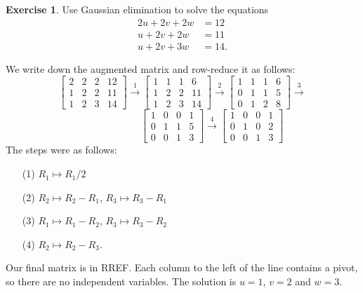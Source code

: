 \documentclass[a4paper]{book}
\newcommand{\xra}       {\xrightarrow}
\renewcommand{\:}{\colon}
\theoremstyle{definition}
\newtheorem{exercise}[theorem]{Exercise}
\renewenvironment{solution}{\SolutionInline}{\endSolutionInline}
\begin{document}
\begin{exercise}
 Use Gaussian elimination to solve the equations
 \begin{align*}
  2u + 2v + 2w &= 12 \\
   u + 2v + 2w &= 11 \\
   u + 2v + 3w &= 14.
 \end{align*}
\end{exercise}
\begin{solution}
 We write down the augmented matrix and row-reduce it as follows:
 {\small \[
  \left[\begin{array}{ccc|c}
    2 &  2 &  2 & 12 \\
    1 &  2 &  2 & 11 \\
    1 &  2 &  3 & 14
  \end{array}\right]
  \xra{1}
  \left[\begin{array}{ccc|c}
    1 &  1 &  1 &  6 \\
    1 &  2 &  2 & 11 \\
    1 &  2 &  3 & 14
  \end{array}\right]
  \xra{2}
  \left[\begin{array}{ccc|c}
    1 &  1 &  1 &  6 \\
    0 &  1 &  1 &  5 \\
    0 &  1 &  2 &  8
  \end{array}\right]
  \xra{3}
  \] \[ \hspace{6em}
  \left[\begin{array}{ccc|c}
    1 &  0 &  0 &  1 \\
    0 &  1 &  1 &  5 \\
    0 &  0 &  1 &  3
  \end{array}\right]
  \xra{4}
  \left[\begin{array}{ccc|c}
    1 &  0 &  0 &  1 \\
    0 &  1 &  0 &  2 \\
    0 &  0 &  1 &  3
  \end{array}\right]
 \]}
 The steps were as follows:
 \begin{itemize}
  \item[(1)] $R_1\mapsto R_1/2$
  \item[(2)] $R_2\mapsto R_2-R_1$, $R_3\mapsto R_3-R_1$
  \item[(3)] $R_1\mapsto R_1-R_2$, $R_3\mapsto R_3-R_2$
  \item[(4)] $R_2\mapsto R_2-R_3$.
 \end{itemize}
 Our final matrix is in RREF.  Each column to the left of the line
 contains a pivot, so there are no independent variables.  The
 solution is $u=1$, $v=2$ and $w=3$.
\end{solution}
\end{document}
